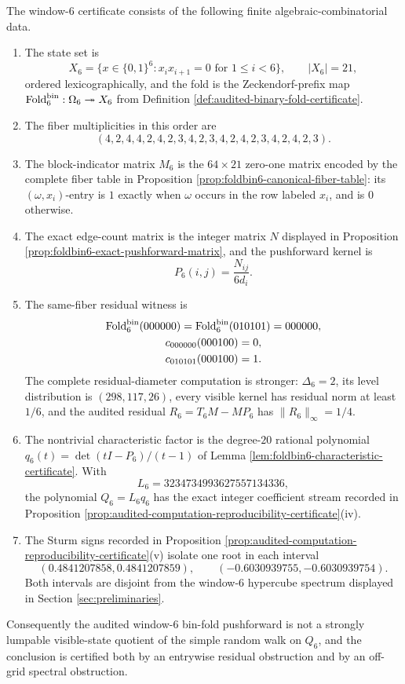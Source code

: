 \begin{theorem}\label{thm:single-exact-fold6-certificate}
The window-\(6\) certificate consists of the following finite algebraic-combinatorial data.
\begin{enumerate}[label=\textup{(\roman*)}]
\item The state set is
\[
X_6=\{x\in\{0,1\}^6:x_i x_{i+1}=0\text{ for }1\le i<6\},
\qquad |X_6|=21,
\]
ordered lexicographically, and the fold is the Zeckendorf-prefix map
\(\operatorname{Fold}_6^{\mathrm{bin}}:\Omega_6\twoheadrightarrow X_6\) from Definition \ref{def:audited-binary-fold-certificate}.
\item The fiber multiplicities in this order are
\[
(4,2,4,4,2,4,2,3,4,2,3,4,2,4,2,3,4,2,4,2,3).
\]
\item The block-indicator matrix \(M_6\) is the \(64\times21\) zero-one matrix encoded by the complete fiber table in Proposition \ref{prop:foldbin6-canonical-fiber-table}: its \((\omega,x_i)\)-entry is \(1\) exactly when \(\omega\) occurs in the row labeled \(x_i\), and is \(0\) otherwise.
\item The exact edge-count matrix is the integer matrix \(N\) displayed in Proposition \ref{prop:foldbin6-exact-pushforward-matrix}, and the pushforward kernel is
\[
P_6(i,j)=\frac{N_{ij}}{6d_i}.
\]
\item The same-fiber residual witness is
\[
\begin{gathered}
\operatorname{Fold}_6^{\mathrm{bin}}(000000)=\operatorname{Fold}_6^{\mathrm{bin}}(010101)=000000,\\
c_{000000}(000100)=0,\\
c_{010101}(000100)=1.
\end{gathered}
\]
The complete residual-diameter computation is stronger: \(\Delta_6=2\), its level distribution is \((298,117,26)\), every visible kernel has residual norm at least \(1/6\), and the audited residual \(R_6=T_6M-MP_6\) has \(\|R_6\|_\infty=1/4\).
\item The nontrivial characteristic factor is the degree-\(20\) rational polynomial \(q_6(t)=\det(tI-P_6)/(t-1)\) of Lemma \ref{lem:foldbin6-characteristic-certificate}.  With
\[
L_6=3234734993627557134336,
\]
the polynomial \(Q_6=L_6q_6\) has the exact integer coefficient stream recorded in Proposition \ref{prop:audited-computation-reproducibility-certificate}\textup{(iv)}.
\item The Sturm signs recorded in Proposition \ref{prop:audited-computation-reproducibility-certificate}\textup{(v)} isolate one root in each interval
\[
(0.4841207858,0.4841207859),
\qquad
(-0.6030939755,-0.6030939754).
\]
Both intervals are disjoint from the window-\(6\) hypercube spectrum displayed in Section \ref{sec:preliminaries}.
\end{enumerate}
Consequently the audited window-\(6\) bin-fold pushforward is not a strongly lumpable visible-state quotient of the simple random walk on \(Q_6\), and the conclusion is certified both by an entrywise residual obstruction and by an off-grid spectral obstruction.
\end{theorem}

